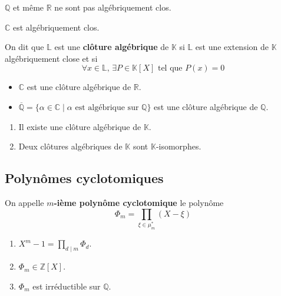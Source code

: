   \begin{cexample}
    $\mathbb{Q}$ et même $\mathbb{R}$ ne sont pas algébriquement clos.
  \end{cexample}

  \begin{theorem}
    $\mathbb{C}$ est algébriquement clos.
  \end{theorem}

  \begin{definition}
    On dit que $\mathbb{L}$ est une \textbf{clôture algébrique} de $\mathbb{K}$ si $\mathbb{L}$ est une extension de $\mathbb{K}$ algébriquement close et si
    \[ \forall x \in \mathbb{L}, \, \exists P \in \mathbb{K}[X] \text{ tel que } P(x) = 0 \]
  \end{definition}

  \begin{example}
    \begin{itemize}
      \item $\mathbb{C}$ est une clôture algébrique de $\mathbb{R}$.
      \item $\overline{\mathbb{Q}} = \{ \alpha \in \mathbb{C} \mid \alpha \text{ est algébrique sur } \mathbb{Q} \}$ est une clôture algébrique de $\mathbb{Q}$.
    \end{itemize}
  \end{example}

  \begin{theorem}
    \begin{enumerate}[label={\bfseries(\roman*)}]
      \item Il existe une clôture algébrique de $\mathbb{K}$.
      \item Deux clôtures algébriques de $\mathbb{K}$ sont $\mathbb{K}$-isomorphes.
    \end{enumerate}
  \end{theorem}

  \subsection{Polynômes cyclotomiques}

  \begin{definition}
    On appelle \textbf{$m$-ième polynôme cyclotomique} le polynôme
    \[ \Phi_m = \prod_{\xi \in \mu_m^*} (X - \xi) \]
  \end{definition}

  \begin{theorem}
    \begin{enumerate}[label={\bfseries(\roman*)}]
      \item $X^m - 1 = \prod_{d \mid m} \Phi_d$.
      \item $\Phi_m \in \mathbb{Z}[X]$.
      \item $\Phi_m$ est irréductible sur $\mathbb{Q}$.
    \end{enumerate}
  \end{theorem}

